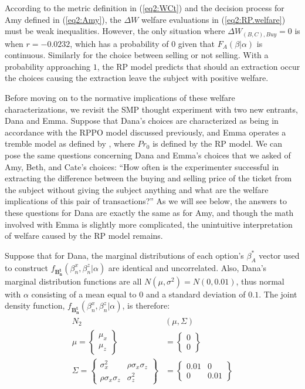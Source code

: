 \documentclass[11pt,a4paper]{report}
\newcommand\Prob{\ensuremath{\mathit{Pr}}}  %
\begin{document}
According to the metric definition in (\ref{eq2:WCt}) and the decision process for Amy defined in (\ref{eq2:Amy}), the $\Delta W$ welfare evaluations in (\ref{eq2:RP.welfare}) must be weak inequalities.
However, the only situation where $\Delta W_{(B,C),\mathit{Buy}} = 0$ is when $r=-0.0232$, which has a probability of $0$ given that $F_A(\beta|\alpha)$ is continuous.
Similarly for the choice between selling or not selling.
With a probability approaching $1$, the RP model predicts that should an extraction occur the choices causing the extraction leave the subject with positive welfare.

Before moving on to the normative implications of these welfare characterizations, we revisit the SMP thought experiment with two new entrants, Dana and Emma.
Suppose that Dana's choices are characterized as being in accordance with the RPPO model discussed previously, and Emma operates a tremble model as defined by \textcite{Loomes2002}, where $ {\Prob}_0$ is defined by the RP model.
We can pose the same questions concerning Dana and Emma's choices that we asked of Amy, Beth, and Cate's choices: \enquote{How often is the experimenter successful in extracting the difference between the buying and selling price of the ticket from the subject without giving the subject anything and what are the welfare implications of this pair of transactions?}
As we will see below, the answers to these questions for Dana are exactly the same as for Amy, and though the math involved with Emma is slightly more complicated, the unintuitive interpretation of welfare caused by the RP model remains.

Suppose that for Dana, the marginal distributions of each option's $\beta_A^*$ vector used to construct $f_{\mathbf{B_n^t}}(\beta_n^ x,\beta_n^ z|\alpha)$ are identical and uncorrelated.{\footnotemark}
Also, Dana's marginal distribution functions are all $N(\mu,\sigma^2) = N(0,0.01)$, thus normal with $\alpha$ consisting of a mean equal to $0$ and a standard deviation of $0.1$.
The joint density function, $f_{\mathbf{B_n^t}}(\beta_n^x,\beta_n^z|\alpha)$, is therefore:
\begin{align}
	\begin{split}
		N_2&(\mu,\Sigma) \\
		\mu =\begin{Bmatrix}\mu_x \\ \mu_z\end{Bmatrix} &= \begin{Bmatrix}0\\0\end{Bmatrix}\\
		\Sigma =\begin{Bmatrix} \sigma_x^2 & \rho\sigma_x\sigma_z \\  \rho\sigma_x\sigma_z & \sigma_z^2 \end{Bmatrix} &=
	\begin{Bmatrix} 0.01 & 0 \\  0 & 0.01 \end{Bmatrix}
	\end{split}
\end{align}
\end{document}
